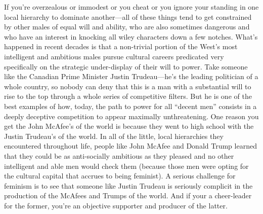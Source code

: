 \documentclass[a4paper,12pt,margin=.5in]{article}
\begin{document}
If you're overzealous or immodest or you cheat or you ignore your
standing in one local hierarchy to dominate another---all of these
things tend to get constrained by other males of equal will and ability,
who are also sometimes dangerous and who have an interest in knocking
all wiley characters down a few notches. What's happened in recent
decades is that a non-trivial portion of the West's most intelligent and
ambitious males pursue cultural careers predicated very specifically on
the strategic under-display of their will to power. Take someone like
the Canadian Prime Minister Justin Trudeau---he's the leading politician
of a whole country, so nobody can deny that this is a man with a
substantial will to rise to the top through a whole series of
competitive filters. But he is one of the best examples of how, today,
the path to power for all ``decent men'' consists in a deeply deceptive
competition to appear maximally unthreatening. One reason you get the
John McAfee's of the world is because they went to high school with the
Justin Trudeau's of the world. In all of the little, local hierarchies
they encountered throughout life, people like John McAfee and Donald
Trump learned that they could be as anti-socially ambitious as they
pleased and no other intelligent and able men would check them (because
those men were opting for the cultural capital that accrues to being
feminist). A serious challenge for feminism is to see that someone like
Justin Trudeau is seriously complicit in the production of the McAfees
and Trumps of the world. And if your a cheer-leader for the former,
you're an objective supporter and producer of the latter.
\end{document}

